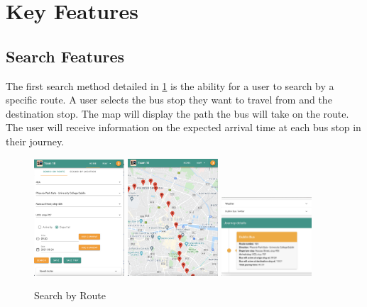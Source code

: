 \documentclass[]{UCD_CS_47360_Report}
\begin{document}
\section{Key Features}

\subsection{Search Features}

The first search method detailed in \ref{fig:SearchByRoute} is the ability for a user to search by a specific route. A user selects the bus stop they want to travel from and the destination stop. The map will display the path the bus will take on the route. The user will receive information on the expected arrival time at each bus stop in their journey.

\begin{figure}[!htb]
    \centering
    \includegraphics[width=0.3\textwidth]{figures/2_2_Search_By_Route_1.png}
    \includegraphics[width=0.3\textwidth]{figures/2_2_Map_View.png}
    \includegraphics[width=0.3\textwidth]{figures/2_2_Search_By_Route_2.png}
    \caption{Search by Route}
    \label{fig:SearchByRoute}
\end{figure}
\end{document}
